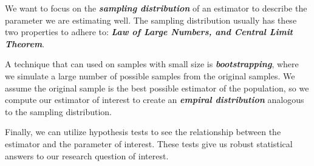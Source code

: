 We want to focus on the \textbf{\textit{sampling distribution}} of an estimator to describe the parameter we are estimating well. The sampling distribution usually has these two properties to adhere to: \textbf{\textit{Law of Large Numbers, and Central Limit Theorem}}.

A technique that can used on samples with small size is \textbf{\textit{bootstrapping}}, where we simulate a large number of possible samples from the original samples. We assume the original sample is the best possible estimator of the population, so we compute our estimator of interest to create an \textbf{\textit{empiral distribution}} analogous to the sampling distribution.

Finally, we can utilize hypothesis tests to see the relationship between the estimator and the parameter of interest. These tests give us robust statistical answers to our research question of interest.

\newpage